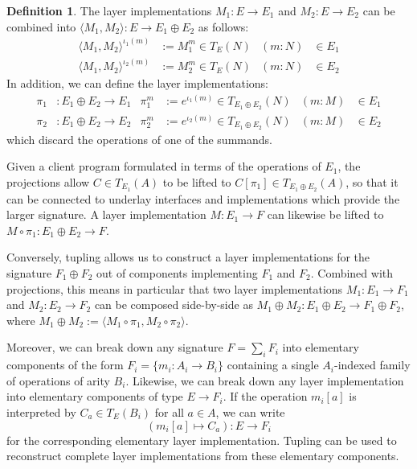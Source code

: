 \documentclass[11pt,oneside]{book}
\theoremstyle{definition}
\newtheorem{definition}[theorem]{Definition}
\begin{document}
\begin{definition}
The layer implementations
$M_1 : E \rightarrow E_1$ and
$M_2 : E \rightarrow E_2$
can be combined into
$\langle M_1, M_2 \rangle : E \rightarrow E_1 \oplus E_2$
as follows:
\begin{align*}
  \langle M_1, M_2 \rangle^{\iota_1(m)} &:= M_1^m \in T_E(N) &
    (m \mathbin: N) &\in E_1 \\
  \langle M_1, M_2 \rangle^{\iota_2(m)} &:= M_2^m \in T_E(N) &
    (m \mathbin: N) &\in E_2
\end{align*}
In addition,
we can define the layer implementations:
\begin{align*}
  \pi_1 &: E_1 \oplus E_2 \rightarrow E_1 &
  \pi_1^m &:= e^{\iota_1(m)} \in T_{E_1 \oplus E_2}(N) &
  (m \mathbin: M) &\in E_1
  \\
  \pi_2 &: E_1 \oplus E_2 \rightarrow E_2 &
  \pi_2^m &:= e^{\iota_2(m)} \in T_{E_1 \oplus E_2}(N) &
  (m \mathbin: M) &\in E_2
\end{align*}
which discard the operations of one of the summands.
\end{definition}

Given a client program
formulated in terms of the operations of $E_1$,
the projections allow $C \in T_{E_1}(A)$
to be lifted to $C[\pi_1] \in T_{E_1 \oplus E_2}(A)$,
so that it can be connected
to underlay interfaces and implementations
which provide the larger signature.
A layer implementation
$M : E_1 \rightarrow F$
can likewise be lifted to
$M \circ \pi_1 : E_1 \oplus E_2 \rightarrow F$.

Conversely,
tupling allows us to construct a layer implementations
for the signature $F_1 \oplus F_2$
out of components implementing $F_1$ and $F_2$.
Combined with projections,
this means in particular that
two layer implementations $M_1 : E_1 \rightarrow F_1$
and $M_2 : E_2 \rightarrow F_2$
can be composed side-by-side as
$M_1 \oplus M_2 : E_1 \oplus E_2 \rightarrow F_1 \oplus F_2$,
where
$M_1 \oplus M_2 := \langle M_1 \circ \pi_1, M_2 \circ \pi_2 \rangle$.

Moreover,
we can break down any signature $F = \sum_i F_i$ into elementary
components of the form $F_i = \{ m_i : A_i \rightarrow B_i \}$
containing a single $A_i$-indexed family of operations of arity $B_i$.
Likewise,
we can break down any layer implementation into
elementary components of type $E \rightarrow F_i$.
If the operation $m_i[a]$
is interpreted by $C_a \in T_E(B_i)$ for all $a \in A$,
we can write
\[
  (m_i[a] \mapsto C_a) : E \rightarrow F_i
\]
for the corresponding elementary layer implementation.
Tupling can be used to reconstruct complete layer implementations
from these elementary components.
\end{document}
